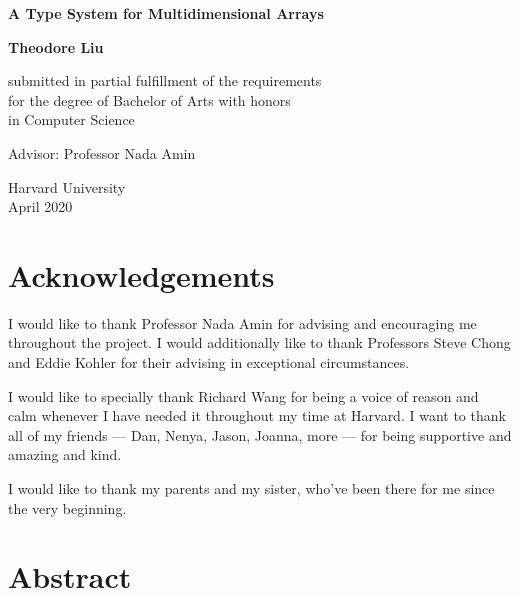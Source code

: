 \documentclass{report}
\begin{document}
\begin{titlepage}
   \begin{center}
       \vspace*{1cm}

       \vfill
       {\large\textbf{A Type System for Multidimensional Arrays}}


       \vspace{1.5cm}

       \textbf{Theodore Liu}

       \vspace{1.5cm}

       submitted in partial fulfillment of the requirements \\
       for the degree of Bachelor of Arts with honors \\
       in Computer Science

       \vspace{1.5cm}

       Advisor: Professor Nada Amin

       \vspace{0.8cm}


       Harvard University\\
       April 2020

       \vfill
       \vspace*{1cm}
   \end{center}
\end{titlepage}

\chapter*{Acknowledgements}

I would like to thank Professor Nada Amin for advising and encouraging me throughout the project. I would additionally like to thank Professors Steve Chong and Eddie Kohler for their advising in exceptional circumstances.

I would like to specially thank Richard Wang for being a voice of reason and calm whenever I have needed it throughout my time at Harvard. I want to thank all of my friends --- Dan, Nenya, Jason, Joanna, more --- for being supportive and amazing and kind.

I would like to thank my parents and my sister, who've been there for me since the very beginning.

\chapter*{Abstract}
\end{document}
